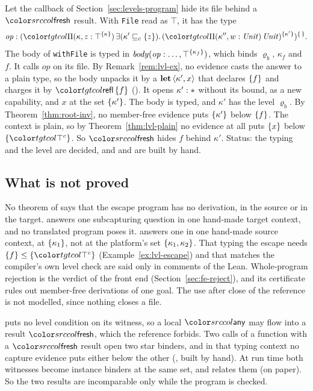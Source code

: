\begin{example}\label{ex:lvl-fresh}
Let the callback of Section~\ref{sec:levels-program} hide its file behind a $\cfresh$ result. With \lstinline{File} read as $\top$, it has the type
\[
\mathit{op} : \capt{(\pit[\kappa, z]{\capt{\top}{\cset{\kappa}}}{\exc{\kappa'}{\cset{z}}{\capt{(\pit[\kappa'', w]{\Unit}{\Unit})}{\cset{\kappa'}}}})}{\cempty} .
\] The body of \lstinline{withFile} is typed in $\mathit{body}(\mathit{op} : \ldots, \top^{\{\kappa_f\}})$, which binds $\varrho_b$, $\kappa_f$ and $f$. It calls $\mathit{op}$ on its file. By Remark~\ref{rem:lvl-ex}, no evidence casts the answer to a plain type, so the body unpacks it by a $\mathbf{let}\,\langle \kappa', x\rangle$ that declares $\{f\}$ and charges it by $\ev{refl}\,\cset{f}$ (). It opens $\kappa' : \ast$ without its bound, as a new capability, and $x$ at the set $\{\kappa'\}$. The body is typed, and $\kappa'$ has the level $\varrho_b$. By Theorem~\ref{thm:root-inv}, no member-free evidence puts $\{\kappa'\}$ below $\{f\}$. The context is plain, so by Theorem~\ref{thm:lvl-plain} no evidence at all puts $\{x\}$ below $\cset{\topc}$. So $\cfresh$ hides $f$ behind $\kappa'$. Status: the typing and the level are decided, and  and  are built by hand.
\end{example}

\subsection{What is not proved}\label{sec:levels-open}

No theorem of \treeCC says that the escape program has no derivation, in the source or in the target.  answers one subcapturing question in one hand-made target context, and no translated program poses it.  answers one in one hand-made source context, at $\{\kappa_1\}$, not at the platform's set $\{\kappa_1, \kappa_2\}$. That typing the escape needs $\cset{f} \le \cset{\topc}$ (Example~\ref{ex:lvl-escape}) and that  matches the compiler's own level check are said only in comments of the Lean. Whole-program rejection is the verdict of the front end (Section~\ref{sec:fe-reject}), and its certificate rules out member-free derivations of one goal. The use after close of the reference is not modelled, since nothing closes a file.

 puts no level condition on its witness, so a local $\cany$ may flow into a result $\cfresh$, which the reference forbids. Two calls of a function with a $\cfresh$ result open two star binders, and in that typing context no capture evidence puts either below the other (, built by hand). At run time both witnesses become instance binders at the same set, and  relates them (on paper). So the two results are incomparable only while the program is checked.
